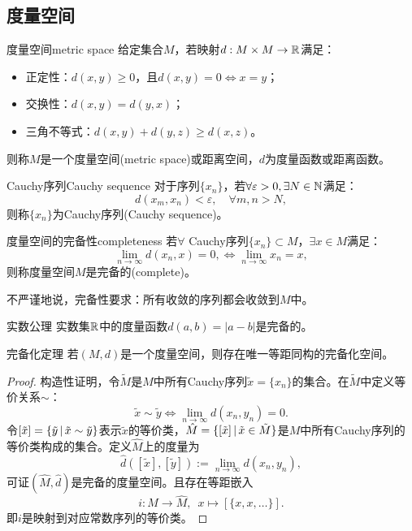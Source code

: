 \subsection{度量空间}

\begin{definition}
    {度量空间}{metric space}
    给定集合$M$，若映射$d:M\times M\to\mathbb R$满足：
    \begin{itemize}
        \item 正定性：$d(x,y)\geq 0$，且$d(x,y)=0\iff x=y$；
        \item 交换性：$d(x,y)=d(y,x)$；
        \item 三角不等式：$d(x,y)+d(y,z)\geq d(x,z)$。
    \end{itemize}
    则称$M$是一个度量空间(metric space)或距离空间，$d$为度量函数或距离函数。
\end{definition}

\begin{definition}
    {Cauchy序列}{Cauchy sequence}
    对于序列$\{x_n\}$，若$\forall\varepsilon>0,\exists N\in\mathbb N$满足：
    \begin{equation}
        d(x_m,x_n)<\varepsilon,\quad\forall m,n>N,
    \end{equation}
    则称$\{x_n\}$为Cauchy序列(Cauchy sequence)。
\end{definition}

\begin{definition}
    {度量空间的完备性}{completeness}
    若$\forall$ Cauchy序列$\{x_n\}\subset M$，$\exists x\in M$满足：
    \[
        \lim_{n\to\infty}d(x_n,x)=0,\iff\lim_{n\to\infty}x_n=x,
    \]
    则称度量空间$M$是完备的(complete)。
\end{definition}

\begin{remark}
    不严谨地说，完备性要求：所有收敛的序列都会收敛到$M$中。%
\end{remark}

\begin{example}
    {实数公理}{}
    实数集$\mathbb R$中的度量函数$d(a,b)=|a-b|$是完备的。
\end{example}

\begin{theorem}
    {完备化定理}{}
    若$(M,d)$是一个度量空间，则存在唯一等距同构的完备化空间。%
\end{theorem}

\begin{proof}
    构造性证明，令$\tilde M$是$M$中所有Cauchy序列$\tilde x=\{x_n\}$的集合。在$\tilde M$中定义等价关系$\sim$：
    \[
        \tilde x\sim\tilde y\iff\lim_{n\to\infty}d(x_n,y_n)=0.
    \]
    令$[\tilde x]=\{\tilde y\,|\,\tilde x\sim\tilde y\}$表示$\tilde x$的等价类，$\hat M=\{[\tilde x]\,|\,\tilde x\in\tilde M\}$是$M$中所有Cauchy序列的等价类构成的集合。定义$\hat M$上的度量为
    \[
        \hat d([\tilde x],[\tilde y]):=\lim_{n\to\infty}d(x_n,y_n),
    \]
    可证$(\hat M,\hat d)$是完备的度量空间。且存在等距嵌入
    \[
        i:M\to\hat M,\enspace x\mapsto[\{x,x,\ldots\}].
    \]
    即$i$是映射到对应常数序列的等价类。
\end{proof}

